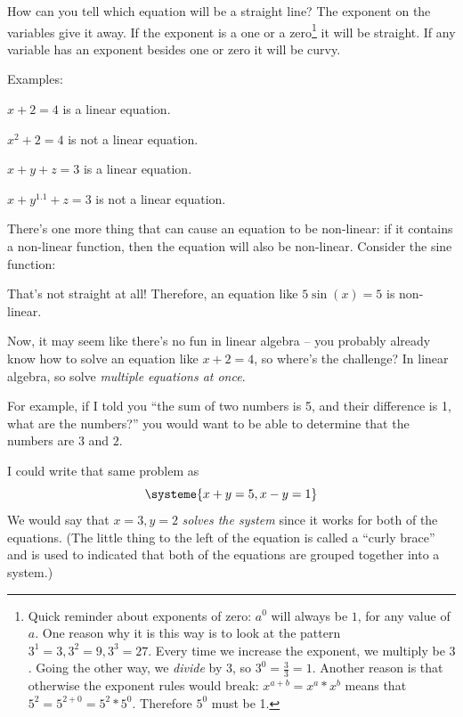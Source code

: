 \documentclass[a4paper,twoside,12pt]{memoir}  %
\begin{document}
How can you tell which equation will be a straight line? The exponent on the variables give it away. If the exponent is a one or a zero\footnote{Quick reminder about exponents of zero: $a^0$ will always be $1$, for any value of $a$. One reason why it is this way is to look at the pattern $3^1 = 3, 3^2 = 9, 3^3 = 27$. Every time we increase the exponent, we multiply be $3$. Going the other way, we \textit{divide} by $3$, so $3^0 = \frac{3}{3} = 1$. Another reason is that otherwise the exponent rules would break: $x^{a+b} = x^a*x^b$ means that $5^2 = 5^{2+0} = 5^2*5^0$. Therefore $5^0$ must be 1.} it will be straight. If any variable has an exponent besides one or zero it will be curvy.

Examples:
\begin{list}{}
\item $x + 2 = 4$ is a linear equation.
\item $x^2 + 2 = 4$ is not a linear equation.
\item $x + y + z = 3$ is a linear equation.
\item $x + y^{1.1} + z = 3$ is not a linear equation.
\end{list}

There's one more thing that can cause an equation to be non-linear: if it contains a non-linear function, then the equation will also be non-linear. Consider the sine function:


That's not straight at all! Therefore, an equation like $5 \sin(x) = 5$ is non-linear.

Now, it may seem like there's no fun in linear algebra -- you probably already know how to solve an equation like $x + 2 = 4$, so where's the challenge?
In linear algebra, so solve \textit{multiple equations at once}.

For example, if I told you ``the sum of two numbers is 5, and their difference is 1, what are the numbers?'' you would want to be able to determine that the numbers are $3$ and $2$.

I could write that same problem as
\begin{equation*}
  \systeme{
    x + y = 5,
    x - y = 1
    }
\end{equation*}
We would say that $x = 3, y = 2$ \textit{solves the system} since it works for both of the equations.
(The little thing to the left of the equation is called a ``curly brace'' and is used to indicated that both of the equations are grouped together into a system.)
\end{document}
